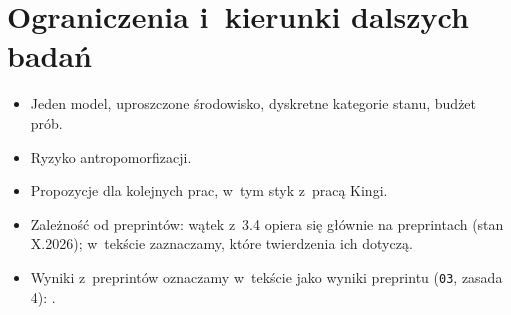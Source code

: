 \section{Ograniczenia i~kierunki dalszych badań}
\label{sec:6-3}

\begin{planroboczy}[ok. 1 s.]
\begin{itemize}
  \item Jeden model, uproszczone środowisko, dyskretne kategorie stanu, budżet prób.
  \item Ryzyko antropomorfizacji.
  \item Propozycje dla kolejnych prac, w~tym styk z~pracą Kingi.
  \item Zależność od preprintów: wątek z~3.4 opiera się głównie na preprintach (stan X.2026); w~tekście zaznaczamy, które twierdzenia ich dotyczą.
  \item Wyniki z~preprintów oznaczamy w~tekście jako wyniki preprintu (\texttt{03}, zasada 4): \cite{ren2026ai}.
\end{itemize}

\end{planroboczy}
